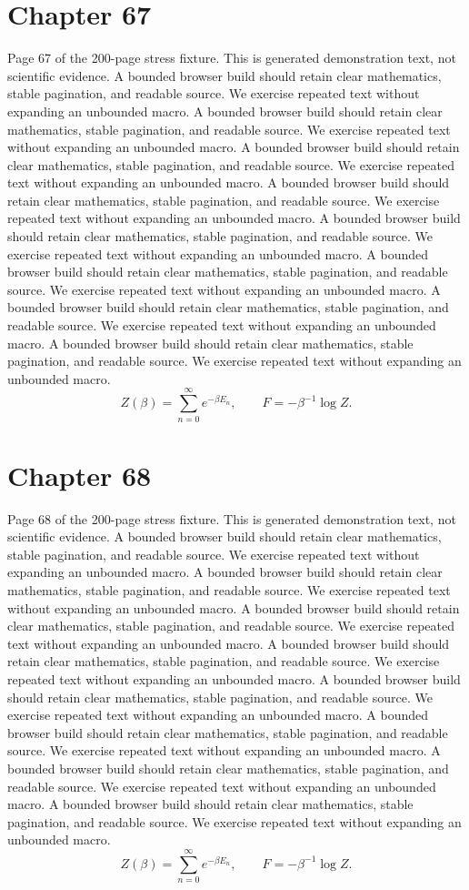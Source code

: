 \documentclass[11pt]{article}
\begin{document}
\section*{Chapter 67}
Page 67 of the 200-page stress fixture. This is generated demonstration text, not scientific evidence.
A bounded browser build should retain clear mathematics, stable pagination, and readable source. We exercise repeated text without expanding an unbounded macro.
A bounded browser build should retain clear mathematics, stable pagination, and readable source. We exercise repeated text without expanding an unbounded macro.
A bounded browser build should retain clear mathematics, stable pagination, and readable source. We exercise repeated text without expanding an unbounded macro.
A bounded browser build should retain clear mathematics, stable pagination, and readable source. We exercise repeated text without expanding an unbounded macro.
A bounded browser build should retain clear mathematics, stable pagination, and readable source. We exercise repeated text without expanding an unbounded macro.
A bounded browser build should retain clear mathematics, stable pagination, and readable source. We exercise repeated text without expanding an unbounded macro.
A bounded browser build should retain clear mathematics, stable pagination, and readable source. We exercise repeated text without expanding an unbounded macro.
A bounded browser build should retain clear mathematics, stable pagination, and readable source. We exercise repeated text without expanding an unbounded macro.
\[Z(\beta)=\sum_{n=0}^{\infty}e^{-\beta E_n},\qquad F=-\beta^{-1}\log Z.\]
\newpage
\section*{Chapter 68}
Page 68 of the 200-page stress fixture. This is generated demonstration text, not scientific evidence.
A bounded browser build should retain clear mathematics, stable pagination, and readable source. We exercise repeated text without expanding an unbounded macro.
A bounded browser build should retain clear mathematics, stable pagination, and readable source. We exercise repeated text without expanding an unbounded macro.
A bounded browser build should retain clear mathematics, stable pagination, and readable source. We exercise repeated text without expanding an unbounded macro.
A bounded browser build should retain clear mathematics, stable pagination, and readable source. We exercise repeated text without expanding an unbounded macro.
A bounded browser build should retain clear mathematics, stable pagination, and readable source. We exercise repeated text without expanding an unbounded macro.
A bounded browser build should retain clear mathematics, stable pagination, and readable source. We exercise repeated text without expanding an unbounded macro.
A bounded browser build should retain clear mathematics, stable pagination, and readable source. We exercise repeated text without expanding an unbounded macro.
A bounded browser build should retain clear mathematics, stable pagination, and readable source. We exercise repeated text without expanding an unbounded macro.
\[Z(\beta)=\sum_{n=0}^{\infty}e^{-\beta E_n},\qquad F=-\beta^{-1}\log Z.\]
\newpage
\end{document}
